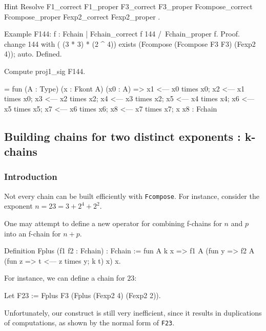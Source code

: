 \begin{Coqsrc}
Hint Resolve F1_correct F1_proper
     F3_correct F3_proper Fcompose_correct Fcompose_proper
     Fexp2_correct Fexp2_proper .

Example F144:  {f : Fchain | Fchain_correct f 144 /\
                                Fchain_proper f}.
Proof.
 change 144 with ( (3 * 3) * (2 ^ 4))%
 exists (Fcompose (Fcompose F3 F3) (Fexp2 4)); auto.
Defined.


Compute proj1_sig F144.
\end{Coqsrc}

\begin{Coqanswer}
= fun (A : Type) (x : Fkont A) (x0 : A) =>
       x1 <--- x0 times x0;
       x2 <--- x1 times x0;
       x3 <--- x2 times x2;
       x4 <--- x3 times x2;
       x5 <--- x4 times x4;
       x6 <--- x5 times x5; 
       x7 <--- x6 times x6; 
       x8 <--- x7 times x7; 
       x x8
     : Fchain  
\end{Coqanswer}



\subsection{Building chains for two distinct exponents : k-chains  \label{Kkonts-section}}

\subsubsection{Introduction}
Not every chain can be built efficiently  with \texttt{Fcompose}.
 For instance, consider the exponent $n= 23 = 3 + 2^4 + 2^2$. 

One may attempt to define a new operator  for combining f-chains for 
$n$ and $p$ into an f-chain for $n+p$.

\begin{Coqbad}
Definition Fplus (f1 f2 : Fchain) : Fchain :=
  fun A k x => 
   f1 A (fun y => 
            f2 A (fun z => t <--- z times y; k t) x) 
            x.
\end{Coqbad}

For instance, we can define a chain for $23$:

\begin{Coqbad}
Let F23 := Fplus F3 (Fplus (Fexp2 4) (Fexp2 2)).  
\end{Coqbad}

Unfortunately, our construct is still very inefficient, since it results in 
duplications of computations, as shown by the normal form of \texttt{F23}.

